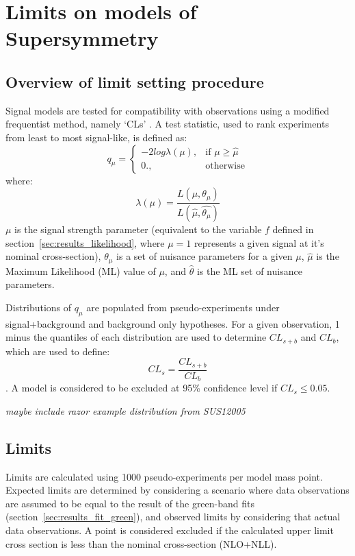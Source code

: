 \section{Limits on models of Supersymmetry}  %
\label{sec:interpretation_limits}

\subsection{Overview of limit setting procedure}
Signal models are tested for compatibility with observations using
a modified frequentist method, namely `CLs' \cite{alread-cls}. A test statistic,
used to rank
experiments from least to most signal-like, is defined as:
% 
\begin{equation}
q_{\mu} = \begin{cases} -2log\lambda(\mu), & \mbox{if } \mu \geq \hat{\mu} \\
0., & \mbox{otherwise} \end{cases}
\end{equation}
% 
where:
% 
\begin{equation}
\lambda(\mu) = \frac{L(\mu, \theta_{\mu})}{L(\hat{\mu}, \hat{\theta_{\mu}})}
\end{equation}
% 
$\mu$ is the signal strength parameter (equivalent to the variable $f$ defined
in section~\ref{sec:results_likelihood}, where $\mu=1$ represents a given
signal at it's nominal cross-section), $\theta_{\mu}$ is a set of nuisance 
parameters for a given $\mu$, $\hat {\mu}$ is the Maximum Likelihood
(ML) value of $\mu$, and $\hat{\theta}$ is the ML set of nuisance parameters.

Distributions of $q_{\mu}$ are populated from pseudo-experiments under
signal+background and background only hypotheses. For a given observation, 1
minus the quantiles of each distribution are used to determine $CL_{s+b}$ and
$CL_b$, which are used to define:
% 
\begin{equation}
CL_s = \frac{CL_{s+b}}{CL_b}
\end{equation}.
% 
A model is considered to be excluded at 95\% confidence level if
$CL_s \leq 0.05$.

\emph{maybe include razor example distribution from SUS12005}

\subsection{Limits}
Limits are calculated using 1000 pseudo-experiments per model mass point.
Expected limits are determined by considering a scenario where data observations
are assumed to be equal to the result of the green-band fits
(section~\ref{sec:results_fit_green}), and observed
limits by considering that actual data observations.
A point is considered excluded if the calculated upper limit cross section is
less than the nominal cross-section (NLO+NLL).

